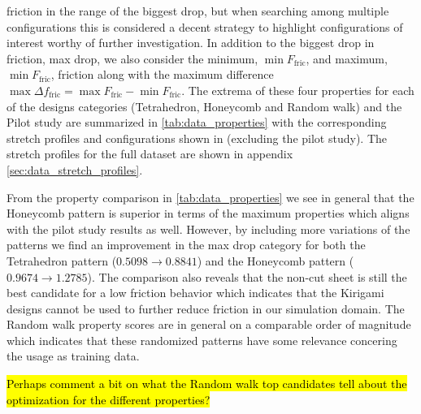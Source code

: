 friction in the range of the biggest drop, but when searching among multiple
configurations this is considered a decent strategy to highlight configurations
of interest worthy of further investigation. In addition to the biggest drop in
friction, max drop, we also consider the minimum, $\min F_{\text{fric}}$, and
maximum, $\min F_{\text{fric}}$, friction along with the maximum difference
$\max \Delta f_{\text{fric}} = \max F_{\text{fric}} - \min F_{\text{fric}}$. The
extrema of these four properties for each of the designs categories
(Tetrahedron, Honeycomb and Random walk) and the Pilot study are summarized in
\cref{tab:data_properties} with the corresponding stretch profiles and
configurations shown in  (excluding the
pilot study). The stretch profiles for the full dataset are shown in appendix
\cref{sec:data_stretch_profiles}. 

From the property comparison in \cref{tab:data_properties} we see in general that the Honeycomb pattern is superior in terms of the maximum properties which aligns with the pilot study results as well. However, by including more variations of the patterns we find an improvement in the max drop category for both the Tetrahedron pattern ($0.5098 \to 0.8841$) and the Honeycomb pattern ($0.9674 \to 1.2785$). The comparison also reveals that the non-cut sheet is still the best candidate for a low friction behavior which indicates that the Kirigami designs cannot be used to further reduce friction in our simulation domain. The Random walk property scores are in general on a comparable order of magnitude which indicates that these randomized patterns have some relevance concering the usage as training data.

\hl{Perhaps comment a bit on what the Random walk top candidates tell about the optimization for the different properties?}

